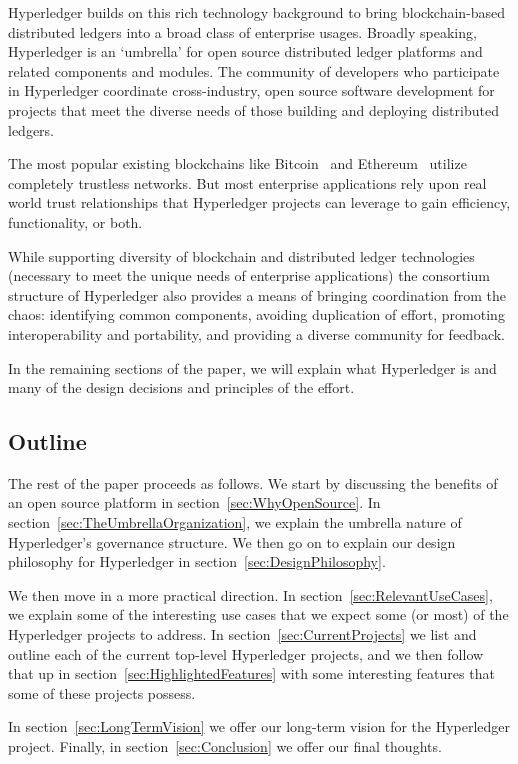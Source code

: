 Hyperledger builds on this rich technology background to bring blockchain-based distributed ledgers into a broad class of enterprise usages.  Broadly speaking, Hyperledger is an `umbrella' for open source distributed ledger platforms and related components and modules. The community of developers who participate in Hyperledger coordinate cross-industry, open source software development for projects that meet the diverse needs of those building and deploying distributed ledgers. 

The most popular existing blockchains like Bitcoin~\cite{Nak08} and Ethereum~\cite{But13} utilize completely trustless networks.  But most enterprise applications rely upon real world trust relationships that Hyperledger projects can leverage to gain efficiency, functionality, or both.

While supporting diversity of blockchain and distributed ledger technologies (necessary to meet the unique needs of enterprise applications) the consortium structure of Hyperledger also provides a means of bringing coordination from the chaos: identifying common components, avoiding duplication of effort, promoting interoperability and portability, and providing a diverse community for feedback.

In the remaining sections of the paper, we will explain what Hyperledger is and many of the design decisions and principles of the effort.

\subsection{Outline}
The rest of the paper proceeds as follows.  We start by discussing the benefits of an open source platform in section~\ref{sec:WhyOpenSource}.  In section~\ref{sec:TheUmbrellaOrganization}, we explain the umbrella nature of Hyperledger's governance structure.  We then go on to explain our design philosophy for Hyperledger in section~\ref{sec:DesignPhilosophy}.

We then move in a more practical direction.  In section~\ref{sec:RelevantUseCases}, we explain some of the interesting use cases that we expect some (or most) of the Hyperledger projects to address.  In section~\ref{sec:CurrentProjects} we list and outline each of the current top-level Hyperledger projects, and we then follow that up in section~\ref{sec:HighlightedFeatures} with some interesting features that some of these projects possess.

In section~\ref{sec:LongTermVision} we offer our long-term vision for the Hyperledger project.  Finally, in section~\ref{sec:Conclusion} we offer our final thoughts.
